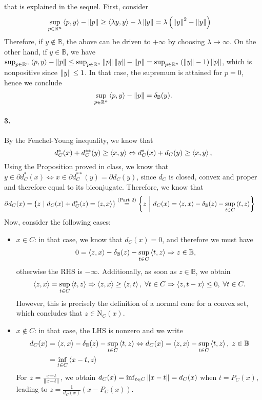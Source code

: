 \documentclass[10pt]{article}
\begin{document}
that is explained in the sequel. First, consider
\begin{align*}
    \sup_{p \in \mathbb{R}^n} \left\langle p, y \right\rangle - \left \| p \right \| &\geq
    \left\langle \lambda y, y \right\rangle - \lambda \left \| y \right \| = \lambda
    \left( \left \| y \right \|^2 - \left \| y \right \|\right)
\end{align*}
Therefore, if $y \notin \mathbb{B}$, the above can be driven to $+\infty$ by
choosing $\lambda \to \infty$. On the other hand, if $y \in \mathbb{B}$, we have
$\sup_{p \in \mathbb{R}^n} \left\langle p, y \right\rangle - \left \| p \right \| \leq \sup_{p \in \mathbb{R}^n} \left \| p \right \|
\left \| y \right \| - \left \| p \right \| = \sup_{p \in \mathbb{R}^n} \left( \left \| y \right \| - 1 \right)\left \| p \right \|$,
which is nonpositive since $\left \| y \right \| \leq 1$. In that case, the supremum is
attained for $p = 0$, hence we conclude
\[
    \sup_{p \in \mathbb{R}^n} \left\langle p, y \right\rangle - \left \| p \right \| = \delta_{\mathbb{B}}(y).
\]

\paragraph{3.}
By the Fenchel-Young inequality, we know that
\[
    d_C^*(x) + d_C^{**}(y) \geq \left\langle x, y \right\rangle \Leftrightarrow
    d_C^*(x) + d_C(y) \geq \left\langle x, y \right\rangle,
\]
Using the Proposition proved in class, we know that $y \in \partial d_C^*(x)
\Leftrightarrow x \in \partial d_C^{**}(y) = \partial d_C(y)$, since $d_C$ is
closed, convex and proper and therefore equal to its biconjugate. Therefore,
we know that
\begin{align*}
    \partial d_{C}(x) &= \left\{ z \ \middle| \  d_{C}(x) + d^*_{C}(z) = \left\langle z, x \right\rangle \right\}
    \overset{\text{(Part 2)}}{=}
    \left\{ z \ \middle| \  d_{C}(x) = \left\langle z, x \right\rangle - \delta_{\mathbb{B}}(z) - \sup_{t \in C}
    \left\langle t, z \right\rangle \right\}
\end{align*}
Now, consider the following cases:
\begin{itemize}
\item $x \in C$: in that case, we know that $d_{C}(x) = 0$, and therefore we
must have
\begin{align*}
    0 &= \left\langle z, x \right\rangle - \delta_{\mathbb{B}}(z) - \sup_{t \in C} \left\langle t, z \right\rangle
    \Rightarrow z \in \mathbb{B},
\end{align*}
otherwise the RHS is $-\infty$. Additionally, as soon as $z \in \mathbb{B}$, we
obtain
\[
    \left\langle z, x \right\rangle = \sup_{t \in C} \left\langle t, z \right\rangle \Rightarrow
    \left\langle z, x \right\rangle \geq \left\langle z, t \right\rangle, \; \forall t \in C \Rightarrow
    \left\langle z, t - x \right\rangle \leq 0, \; \forall t \in C.
\]
However, this is precisely the definition of a normal cone for a convex set,
which concludes that $z \in \mathrm{N}_{C}(x)$.
\item $x \notin C$: in that case, the LHS is nonzero and we write
\begin{align*}
    d_{C}(x) &= \left\langle z, x \right\rangle - \delta_{\mathbb{B}}(z) - \sup_{t \in C} \left\langle t, z \right\rangle
    \Leftrightarrow d_{C}(x) = \left\langle z, x \right\rangle - \sup_{t \in C} \left\langle t, z \right\rangle, \; z \in
    \mathbb{B} \\
        &= \inf_{t \in C} \left\langle x - t, z \right\rangle
\end{align*}
For $z = \frac{x - t}{\left \| x - t \right \|}$, we obtain $d_{C}(x) = \inf_{t \in C}
\left \| x - t \right \| = d_{C}(x)$ when $t = P_C(x)$, leading to $z = \frac{1}{d_{C}(x)}
(x - P_C(x))$.
\end{itemize}
\end{document}
